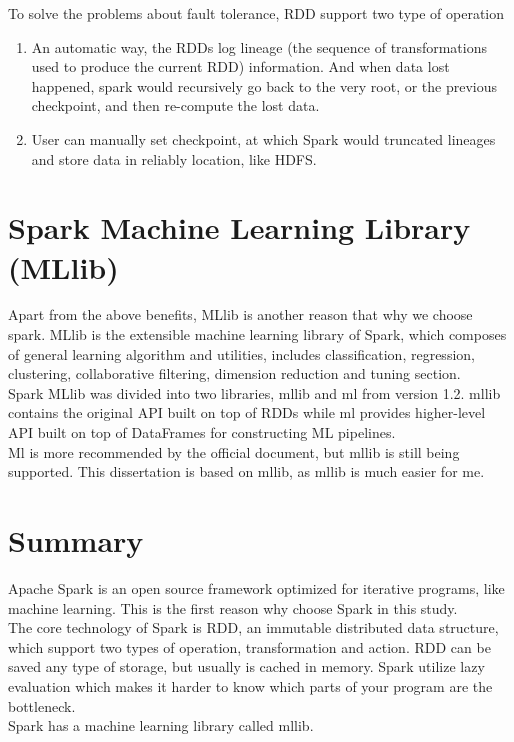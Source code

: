 To solve the problems about fault tolerance, RDD support two type of operation

\begin{enumerate}
	\item An automatic way, the RDDs log lineage (the sequence of transformations used to produce the current RDD) information. And when data lost happened, spark would recursively go back to the very root, or the previous checkpoint, and then re-compute the lost data.
	\item User can manually set checkpoint, at which Spark would truncated lineages and store data in reliably location, like HDFS.
\end{enumerate}

\section{Spark Machine Learning Library (MLlib)\cite{apache_spark_mllib}}
Apart from the above benefits, MLlib is another reason that why we choose spark. MLlib is the extensible machine learning  library of Spark, which composes of general learning algorithm and utilities, includes classification, regression, clustering, collaborative filtering, dimension reduction and tuning section.\\


Spark MLlib was divided into two libraries, mllib and ml from version 1.2. mllib contains the original API built on top of RDDs while ml provides higher-level API built on top of DataFrames for constructing ML pipelines.\\



Ml is more recommended by the official document, but mllib is still being supported. This dissertation is based on mllib, as mllib is much easier for me.


\section{Summary}
Apache Spark is an open source framework optimized for iterative programs, like machine learning. This is the first reason why choose Spark in this study.\\


The core technology of Spark is RDD, an immutable distributed data structure, which support two types of operation, transformation and action. RDD can be saved any type of storage, but usually is cached in memory. Spark utilize lazy evaluation which makes it harder to know which parts of your program are the bottleneck.\\


Spark has a machine learning library called mllib.


